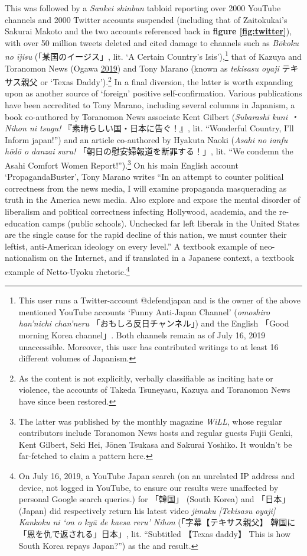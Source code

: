 \documentclass[10pt,british,A4paper,twoside]{memoir}
\begin{document}
This was followed by a \emph{Sankei shinbun} tabloid reporting over 2000
YouTube channels and 2000 Twitter accounts suspended (including that of
Zaitokukai's Sakurai Makoto and the two accounts referenced back in
\textbf{figure \ref{fig:twitter}}), with over 50 million tweets deleted
and cited damage to channels such as \emph{Bōkoku no ījisu}
(「某国のイージス」, lit. `A Certain Country's Isis'),\footnote{This
  user runs a Twitter-account @defendjapan and is the owner of the above
  mentioned YouTube accounts `Funny Anti-Japan Channel' (\emph{omoshiro
  han'nichi chan'neru} 「おもしろ反日チャンネル」) and the English
  「Good morning Korea channel」. Both channels remain as of July 16, 2019
  unaccessible. Moreover, this user has contributed writings to at least
  16 different volumes of Japanism.} that of Kazuya and Toranomon News
(Ogawa \protect\hyperlink{ref-ogawa_eng._2019}{2019}) and Tony Marano
(known as \emph{tekisasu oyaji} テキサス親父 or `Texas
Daddy').\footnote{As the content is not explicitly, verbally
  classifiable as inciting hate or violence, the accounts of Takeda
  Tsuneyasu, Kazuya and Toranomon News have since been restored.} In a
final diversion, the latter is worth expanding upon as another source of
`foreign' positive self-confirmation. Various publications have been
accredited to Tony Marano, including several columns in Japanism, a book
co-authored by Toranomon News associate Kent Gilbert (\emph{Subarashī
kuni ・ Nihon ni tsugu!} 『素晴らしい国・日本に告ぐ！』, lit.
``Wonderful Country, I'll Inform japan!'') and an article co-authored by
Hyakuta Naoki (\emph{Asahi no ianfu hōdō o danzai suru!}
「朝日の慰安婦報道を断罪する！」, lit. ``We condemn the Asahi Comfort
Women Report!'').\footnote{The latter was published by the monthly
  magazine \emph{WiLL}, whose regular contributors include Toranomon
  News hosts and regular guests Fujii Genki, Kent Gilbert, Seki Hei,
  Jōnen Tsukasa and Sakurai Yoshiko. It wouldn't be far-fetched to claim
  a pattern here.} On his main English account `PropagandaBuster', Tony
Marano writes ``In an attempt to counter political correctness from the
news media, I will examine propaganda masquerading as truth in the
America news media. Also explore and expose the mental disorder of
liberalism and political correctness infecting Hollywood, academia, and
the re-education camps (public schools). Unchecked far left liberals in
the United States are the single cause for the rapid decline of this
nation, we must counter their leftist, anti-American ideology on every
level.'' A textbook example of neo-nationalism on the Internet, and if
translated in a Japanese context, a textbook example of
Netto-Uyoku rhetoric.\footnote{On July 16, 2019, a YouTube Japan search (on an
  unrelated IP address and device, not logged in YouTube, to ensure our
  results were unaffected by personal Google search queries.) for
  「韓国」 (South Korea) and 「日本」 (Japan) did respectively return
  his latest video \emph{jimaku {[}Tekisasu oyaji{]} Kankoku ni `on o
  kyū de kaesa reru' Nihon} (「字幕【テキサス親父】
  韓国に「恩を仇で返される」日本」, lit. ``Subtitled 【Texas daddy】
  This is how South Korea repays Japan?'') as the  and 
  result.}
\end{document}
